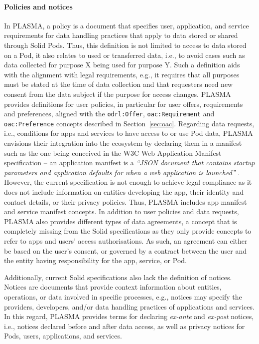\paragraph{Policies and notices}
In PLASMA, a policy is a document that specifies user, application, and service requirements for data handling practices that apply to data stored or shared through Solid Pods.
Thus, this definition is not limited to access to data stored on a Pod, it also relates to used or transferred data, i.e., to avoid cases such as data collected for purpose X being used for purpose Y.
Such a definition aids with the alignment with legal requirements, e.g., it requires that all purposes must be stated at the time of data collection and that requesters need new consent from the data subject if the purpose for access changes.
PLASMA provides definitions for user policies, in particular for user offers, requirements and preferences, aligned with the \texttt{odrl:Offer}, \texttt{oac:Requirement} and \texttt{oac:Preference} concepts described in Section~\ref{sec:oac}.
Regarding data requests, i.e., conditions for apps and services to have access to or use Pod data, PLASMA envisions their integration into the ecosystem by declaring them in a manifest such as the one being conceived in the W3C Web Application Manifest specification -- an application manifest is a \textit{``JSON document that contains startup parameters and application defaults for when a web application is launched''} \citep{manifest_2023}.
However, the current specification is not enough to achieve legal compliance as it does not include information on entities developing the app, their identity and contact details, or their privacy policies.
Thus, PLASMA includes app manifest and service manifest concepts.
In addition to user policies and data requests, PLASMA also provides different types of data agreements, a concept that is completely missing from the Solid specifications as they only provide concepts to refer to apps and users' access authorisations.
As such, an agreement can either be based on the user's consent, or governed by a contract between the user and the entity having responsibility for the app, service, or Pod.

Additionally, current Solid specifications also lack the definition of notices.
Notices are documents that provide context information about entities, operations, or data involved in specific processes, e.g., notices may specify the providers, developers, and/or data handling practices of applications and services. 
In this regard, PLASMA provides terms for declaring \textit{ex-ante} and \textit{ex-post} notices, i.e., notices declared before and after data access, as well as privacy notices for Pods, users, applications, and services.

